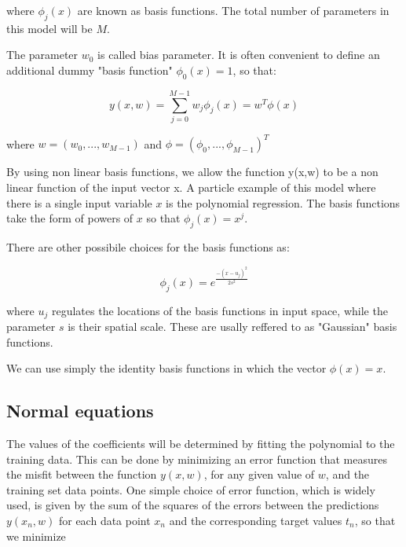 \noindent where $\phi_j(x)$ are known as basis functions. The total number of parameters in this model will be $M$.

\noindent The parameter $w_0$ is called bias parameter. It is often convenient to define an additional dummy "basis function" $\phi_0(x)=1$, so that:

\begin{Equation}[H]
	\centering
	\begin{equation}
	y(x,w)=\sum_{j=0}^{M-1}w_j \phi_j(x) = w^T\phi(x)
	\end{equation}
	\label{eq:mathmodela}
\end{Equation}

\noindent where $w=(w_0,...,w_{M-1})$ and $\phi=(\phi_0,...,\phi_{M-1})^T$

\noindent By using non linear basis functions, we allow the function y(x,w) to be a non linear function of the input vector x.  A particle example of this model where there is a single input variable $x$ is the polynomial regression. The basis functions take the form of powers of $x$ so that $\phi_j(x)=x^j$.

\noindent There are other possibile choices for the basis functions as:

\begin{Equation}[H]
	\centering
	\begin{equation}
		\phi_j(x)=e^{\frac{-(x-u_j)^2}{2s^2}}
	\end{equation}
	\label{eq:mathmodela}
\end{Equation}

\noindent where $u_j$ regulates the locations of the basis functions in input space, while the parameter $s$ is their spatial scale. These are usally reffered to as "Gaussian" basis functions. 

\noindent We can use simply the identity basis functions in which the vector $\phi(x)=x$.

\subsection{Normal equations}
\label{subsec:reglinmulnormeq}
The values of the coefficients will be determined by fitting the polynomial to the training data. This can be done by minimizing an error function that measures the misfit between the function $y(x, w)$, for any given value of $w$, and the training set data points. One simple choice of error function, which is widely used, is given by the sum of the squares of the errors between the predictions $y(x_n, w)$ for each data
point $x_n$ and the corresponding target values $t_n$, so that we minimize

